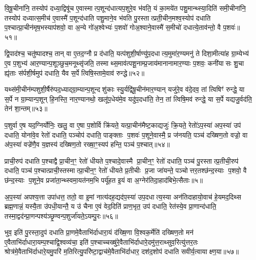 वि॒षू॒चीना॑नि॒ तस्योप॑ दध्या॒द्विषू॑च ए॒वास्मात्प॒शून्द॑धात्यप॒शुरे॒व भ॑वति॒ यं का॒मये॑त पशु॒मान्थ्स्या॒दिति॑ समी॒चीना॑नि॒ तस्योप॑ दध्यात्स॒मीच॑ ए॒वास्मै॑ प॒शून्द॑धाति पशु॒माने॒व भ॑वति पु॒रस्तात्प्रती॒चीन॒मश्व॒स्योप॑ दधाति प॒श्चात्प्रा॒चीन॑मृष॒भस्याप॑शवो॒ वा अ॒न्ये गो॑अ॒श्वेभ्यः॑ प॒शवो॑ गोअ॒श्वाने॒वास्मै॑ स॒मीचो॑ दधात्ये॒ताव॑न्तो॒ वै प॒शवः॑॥५१॥

द्वि॒पाद॑श्च॒ चतु॑ष्पादश्च॒ तान् वा ए॒तद॒ग्नौ प्र द॑धाति॒ यत्प॑शुशी॒र्\mbox{}षाण्यु॑प॒दधात्य॒मुमा॑र॒ण्यमनु॑ ते दिशा॒मीत्या॑ह ग्रा॒म्येभ्य॑ ए॒व प॒शुभ्य॑ आर॒ण्यान्प॒शूञ्छुच॒मनूथ्सृ॑जति॒ तस्माथ्स॒माव॑त्पशू॒नाम्प्र॒जाय॑मानानामार॒ण्याः प॒शवः॒ कनी॑यासः शु॒चा ह्यृ॑ताः स॑र्पशी॒र्\mbox{}षमुप॑ दधाति॒ यैव स॒र्पे त्विषि॒स्तामे॒वाव॑ रुन्द्धे॥५२॥

यथ्स॑मी॒चीन॑म्पशुशी॒र्\mbox{}षैरु॑पद॒ध्याद्ग्रा॒म्यान्प॒शून्दशु॑काः स्यु॒र्यद्वि॑षू॒चीन॑मार॒ण्यान् यजु॑रे॒व व॑दे॒दव॒ तां त्विषिꣳ॑ रुन्द्धे॒ या स॒र्पे न ग्रा॒म्यान्प॒शून् हि॒नस्ति॒ नार॒ण्यानथो॒ खलू॑प॒धेय॑मे॒व यदु॑प॒दधा॑ति॒ तेन॒ तां त्विषि॒मव॑ रुन्द्धे॒ या स॒र्पे यद्यजु॒र्वद॑ति॒ तेन॑ शा॒न्तम्॥५३॥

{\anuvakamend[{ऊ॒नान्तस्योप॑ प्रा॒णास्स्या॒दिति॒ वै प॒शवो॑ रुन्धे॒ चतु॑श्चत्वारिशच्च॥९॥}]}

प॒शुर्वा ए॒ष यद॒ग्निर्योनिः॒ खलु॒ वा ए॒षा प॒शोर्वि क्रि॑यते॒ यत्प्रा॒चीन॑मैष्ट॒काद्यजुः॑ क्रि॒यते॒ रेतो॑ऽप॒स्या॑ अप॒स्या॑ उप॑ दधाति॒ योना॑वे॒व रेतो॑ दधाति॒ पञ्चोप॑ दधाति॒ पाङ्क्ताः प॒शवः॑ प॒शूने॒वास्मै॒ प्र ज॑नयति॒ पञ्च॑ दख्षिण॒तो वज्रो॒ वा अ॑प॒स्या॑ वज्रे॑णै॒व य॒ज्ञस्य॑ दख्षिण॒तो रख्षा॒ꣳ॒स्यप॑ हन्ति॒ पञ्च॑ प॒श्चात्॥५४॥

प्राची॒रुप॑ दधाति प॒श्चाद्वै प्रा॒चीन॒ꣳ॒ रेतो॑ धीयते प॒श्चादे॒वास्मै प्रा॒चीन॒ꣳ॒ रेतो॑ दधाति॒ पञ्च॑ पु॒रस्तात्प्र॒तीची॒रुप॑ दधाति॒ पञ्च॑ प॒श्चात्प्राची॒स्तस्मात्प्रा॒चीन॒ꣳ॒ रेतो॑ धीयते प्र॒तीचीः प्र॒जा जा॑यन्ते॒ पञ्चोत्तर॒तश्छ॑न्द॒स्याः प॒शवो॒ वै छ॑न्द॒स्याः प॒शूने॒व प्रजा॑ता॒न्थ्स्वमा॒यत॑नम॒भि पर्यू॑हत इ॒यं वा अ॒ग्नेर॑तिदा॒हाद॑बिभे॒त्सैताः॥५॥

अ॒प॒स्या॑ अपश्य॒त्ता उपा॑धत्त॒ ततो॒ वा इ॒मां नात्य॑दह॒द्यद॑प॒स्या॑ उप॒दधात्य॒स्या अन॑तिदाहायो॒वाच॑ हे॒यमद॒दिथ्स ब्रह्म॒णान्नं॒ यस्यै॒ता उ॑पधी॒यान्तै॒ य उ॑ चैना ए॒वं वेद॒दिति॑ प्राण॒भृत॒ उप॑ दधाति॒ रेत॑स्ये॒व प्रा॒णान्द॑धाति॒ तस्मा॒द्वद॑न्प्रा॒णन्पश्य॑ञ्छृ॒ण्वन्प॒शुर्जा॑यते॒ऽयम्पु॒रः॥५६॥

भुव॒ इति॑ पु॒रस्ता॒दुप॑ दधाति प्रा॒णमे॒वैताभि॑र्दाधारा॒यं द॑ख्षि॒णा वि॒श्वक॒र्मेति॑ दख्षिण॒तो मन॑ ए॒वैताभि॑र्दाधारा॒यम्प॒श्चाद्वि॒श्वव्य॑चा॒ इति॑ प॒श्चाच्चख्षु॑रे॒वैताभि॑र्दाधारे॒दमु॑त्त॒राथ्सुव॒रित्यु॑त्तर॒तः श्रोत्र॑मे॒वैताभि॑र्दाधारे॒यमु॒परि॑ म॒तिरित्यु॒परि॑ष्टा॒द्वाच॑मे॒वैताभि॑र्दाधार॒ दश॑द॒शोप॑ दधाति सवीर्य॒त्वायाक्ष्ण॒या॥५७॥

